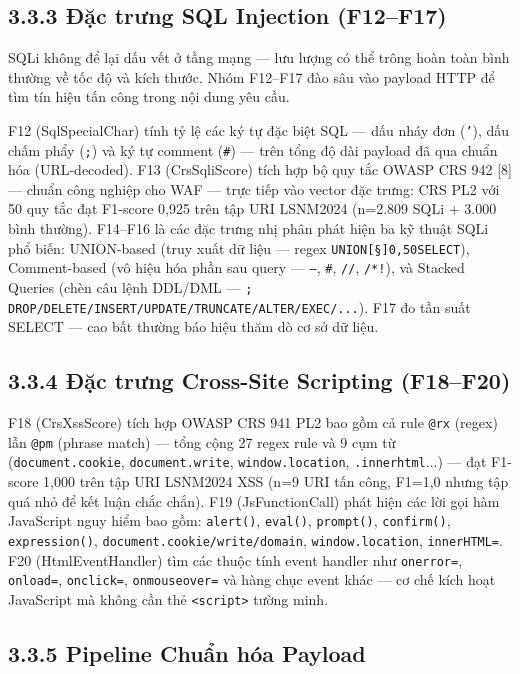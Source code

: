 \documentclass[12pt,a4paper,twoside]{report}
\begin{document}
{\subsection{3.3.3 Đặc trưng SQL Injection (F12–F17)}

SQLi không để lại dấu vết ở tầng mạng — lưu lượng có thể trông hoàn toàn bình thường về tốc độ và kích thước. Nhóm F12–F17 đào sâu vào payload HTTP để tìm tín hiệu tấn công trong nội dung yêu cầu.

F12 (SqlSpecialChar) tính tỷ lệ các ký tự đặc biệt SQL — dấu nháy đơn (\texttt{'}), dấu chấm phẩy (\texttt{;}) và ký tự comment (\texttt{#}) — trên tổng độ dài payload đã qua chuẩn hóa (URL-decoded). F13 (CrsSqliScore) tích hợp bộ quy tắc OWASP CRS 942 [8] — chuẩn công nghiệp cho WAF — trực tiếp vào vector đặc trưng: CRS PL2 với 50 quy tắc đạt F1-score 0,925 trên tập URI LSNM2024 (n=2.809 SQLi + 3.000 bình thường). F14–F16 là các đặc trưng nhị phân phát hiện ba kỹ thuật SQLi phổ biến: UNION-based (truy xuất dữ liệu — regex \texttt{UNION[\s\S]{0,50}SELECT}), Comment-based (vô hiệu hóa phần sau query — \texttt{--}, \texttt{#}, \texttt{/\textit{}/}, \texttt{/*!}), và Stacked Queries (chèn câu lệnh DDL/DML — \texttt{; DROP/DELETE/INSERT/UPDATE/TRUNCATE/ALTER/EXEC/...}). F17 đo tần suất SELECT — cao bất thường báo hiệu thăm dò cơ sở dữ liệu.

\subsection{3.3.4 Đặc trưng Cross-Site Scripting (F18–F20)}

F18 (CrsXssScore) tích hợp OWASP CRS 941 PL2 bao gồm cả rule \texttt{@rx} (regex) lẫn \texttt{@pm} (phrase match) — tổng cộng 27 regex rule và 9 cụm từ (\texttt{document.cookie}, \texttt{document.write}, \texttt{window.location}, \texttt{.innerhtml}...) — đạt F1-score 1,000 trên tập URI LSNM2024 XSS (n=9 URI tấn công, F1=1,0 nhưng tập quá nhỏ để kết luận chắc chắn). F19 (JsFunctionCall) phát hiện các lời gọi hàm JavaScript nguy hiểm bao gồm: \texttt{alert()}, \texttt{eval()}, \texttt{prompt()}, \texttt{confirm()}, \texttt{expression()}, \texttt{document.cookie/write/domain}, \texttt{window.location}, \texttt{innerHTML=}. F20 (HtmlEventHandler) tìm các thuộc tính event handler như \texttt{onerror=}, \texttt{onload=}, \texttt{onclick=}, \texttt{onmouseover=} và hàng chục event khác — cơ chế kích hoạt JavaScript mà không cần thẻ \texttt{<script>} tường minh.

\subsection{3.3.5 Pipeline Chuẩn hóa Payload}

}
\end{document}

